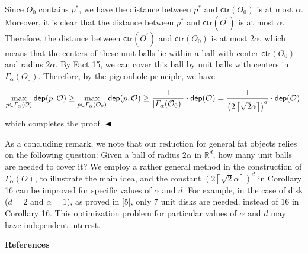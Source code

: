 \documentclass[10pt,a4paper]{article}
\begin{document}
Since $O_{0}$ contains $p^{*}$, we have the distance between $p^{*}$ and $\mathsf{ctr}(O_{0})$ is at most $\alpha$. Moreover, it is clear that the distance between $p^{*}$ and $\mathsf{ctr}(O^{\prime})$ is at most $\alpha$. Therefore, the distance between $\mathsf{ctr}(O^{\prime})$ and $\mathsf{ctr}(O_{0})$ is at most $2\alpha$, which means that the centers of these unit balls lie within a ball with center $\mathsf{ctr}(O_{0})$ and radius $2\alpha$. By Fact 15, we can cover this ball by unit balls with centers in $\varGamma_{\alpha}(O_{0})$. Therefore, by the pigeonhole principle, we have
\par
\[\begin{aligned}
\max_{p\in\varGamma_{\alpha}(\mathcal{O})}\mathsf{dep}(p,\mathcal{O})\geq\max_%
{p\in\varGamma_{\alpha}(\mathcal{O}_{0})}\mathsf{dep}(p,\mathcal{O})\geq\frac{%
1}{|\varGamma_{\alpha}(\mathcal{O}_{0})|}\cdot\mathsf{dep}(\mathcal{O})=\frac{%
1}{{\left(2\left\lceil\sqrt{2}\alpha\right\rceil\right)}^{d}}\cdot\mathsf{dep}%
(\mathcal{O}),
\end{aligned}\]
which completes the proof. $\hfill\blacktriangleleft$
\par
\par
As a concluding remark, we note that our reduction for general fat objects relies on the following question: Given a ball of radius $2\alpha$ in $\mathbb{R}^{d}$, how many unit balls are needed to cover it? We employ a rather general method in the construction of $\varGamma_{\alpha}(O)$, to illustrate the main idea, and the constant ${\left(2\left\lceil\sqrt{2}\alpha\right\rceil\right)}^{d}$ in Corollary 16 can be improved for specific values of $\alpha$ and $d$. For example, in the case of disk ($d=2$ and $\alpha=1$), as proved in [5], only $7$ unit disks are needed, instead of $16$ in Corollary 16. This optimization problem for particular values of $\alpha$ and $d$ may have independent interest.
\par
\par
\par\medskip\noindent\textbf{References}\par
\end{document}
